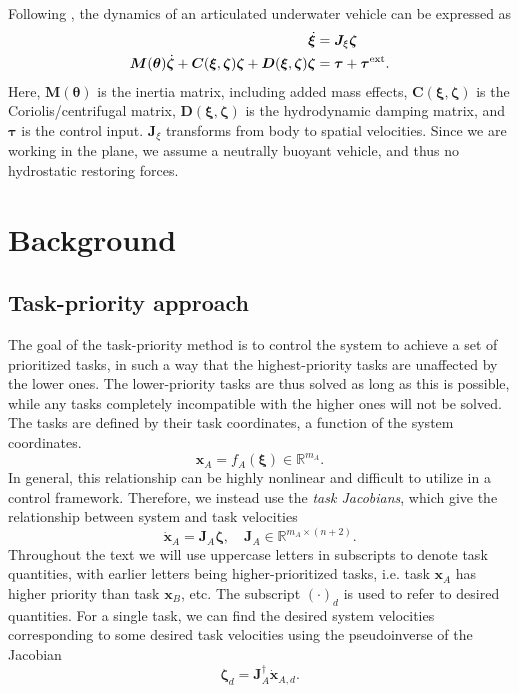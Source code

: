 \documentclass[../main.tex]{subfiles}
\begin{document}
Following \cite{schmidt-didlaukies2018, from2014}, the dynamics of an articulated underwater vehicle can be expressed as
\begin{subequations}
    \label{eq:dynamics}
    \begin{align}
        \dot{\bm{\xi}} &= \bm{J}_\xi \bm{\zeta} \\
        \bm{M}(\bm{\theta}) \dot{\bm{\zeta}} + \bm{C}(\bm{\xi}, \bm{\zeta}) \bm{\zeta}
        + \bm{D}(\bm{\xi}, \bm{\zeta}) \bm{\zeta} &= \bm{\tau} + \bm{\tau}^{\rm ext}.
    \end{align}
\end{subequations}
Here, $\bm{M}(\bm{\theta})$ is the inertia matrix, including added mass effects, $\bm{C}(\bm{\xi}, \bm{\zeta})$ is the Coriolis/centrifugal matrix, $\bm{D}(\bm{\xi}, \bm{\zeta})$ is the hydrodynamic damping matrix, and $\bm{\tau}$ is the control input. $\bm{J}_{\xi}$ transforms from body to spatial velocities. Since we are working in the plane, we assume a neutrally buoyant vehicle, and thus no hydrostatic restoring forces.

\section{Background}
\label{sec:background}

\subsection{Task-priority approach}
\label{sec:background_tp}
The goal of the task-priority method is to control the system to achieve a set of prioritized tasks, in such a way that the highest-priority tasks are unaffected by the lower ones. The lower-priority tasks are thus solved as long as this is possible, while any tasks completely incompatible with the higher ones will not be solved.
The tasks are defined by their task coordinates, a function of the system coordinates.
\begin{equation}
    \bm{x}_A = f_A (\bm{\xi}) \in \mathbb{R}^{m_A}.
\end{equation}
In general, this relationship can be highly nonlinear and difficult to utilize in a control framework. Therefore, we instead use the \emph{task Jacobians}, which give the relationship between system and task velocities
\begin{equation}
    \label{eq:task_definition}
    \dot{\bm{x}}_A = \bm{J}_A \bm{\zeta}, \quad
    \bm{J}_A \in \mathbb{R}^{m_A \times (n + 2)}.
\end{equation}
Throughout the text we will use uppercase letters in subscripts to denote task quantities, with earlier letters being higher-prioritized tasks, i.e. task $\bm{x}_A$ has higher priority than task $\bm{x}_B$, etc. The subscript $(\cdot)_d$ is used to refer to desired quantities.
For a single task, we can find the desired system velocities corresponding to some desired task velocities using the pseudoinverse of the Jacobian
\begin{equation}
    \bm{\zeta}_d = \bm{J}_A^{\dagger} \dot{\bm{x}}_{A,d}.
\end{equation}
\end{document}
